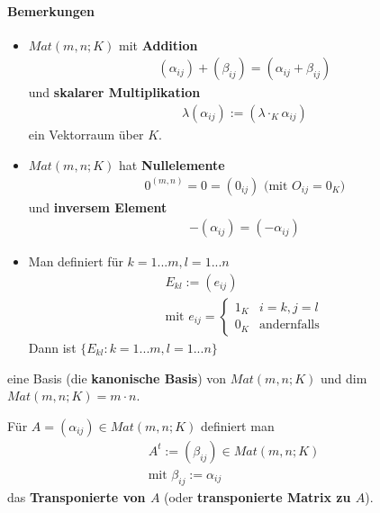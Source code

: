 \documentclass[11pt]{report}
\newcommand*\f[1] {\textbf{#1}}
\begin{document}
\paragraph{Bemerkungen}
\begin{itemize}
 \item $Mat(m,n;K)$ mit \f{Addition}
\begin{align}
 (\alpha_{ij}) + (\beta_{ij}) = (\alpha_{ij} + \beta_{ij})
\end{align}
und \f{skalarer Multiplikation}
\begin{align}
 \lambda (\alpha_{ij}) := (\lambda \cdot_K \alpha_{ij})
\end{align}
ein Vektorraum über $K$.
\item $Mat(m,n;K)$ hat \f{Nullelemente}
\begin{align}
 0^{(m,n)} = 0 = (0_{ij}) \text{ (mit $O_{ij} = 0_K$)}
\end{align}
und \f{inversem Element}
\begin{align}
 -(\alpha_{ij}) = (-\alpha_{ij})
\end{align}
\item Man definiert für $k=1...m, l=1...n$
\begin{align}
 E_{kl} := (e_{ij}) \\
\text{mit } e_{ij} = \left\{ \begin{matrix} 1_K & i=k, j=l \\ 0_K & \text{andernfalls} \end{matrix} \right.
\end{align}
Dann ist $\{ E_{kl}: k=1...m, l=1...n \}$
\end{itemize}
eine Basis (die \f{kanonische Basis}) von $Mat(m,n;K)$ und dim $Mat(m,n;K) = m \cdot n$.

Für $A = (\alpha_{ij}) \in Mat(m,n;K)$ definiert man
\begin{align}
 A^t := (\beta_{ij}) \in Mat(m, n; K) \\
\text{mit } \beta_{ij} := \alpha_{ij}
\end{align}
das \f{Transponierte von $A$} (oder \f{transponierte Matrix zu $A$}).
\end{document}
